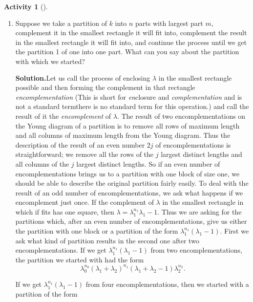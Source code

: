 \documentclass[10pt,]{book}
\theoremstyle{plain}
\theoremstyle{definition}
\newtheorem{activity}[project]{Activity}
\numberwithin{equation}{chapter}
\begin{document}
\begin{activity}[]\label{activity-56}
~\par
\begin{enumerate}[label=(\alph*)]
 \item Suppose we take a partition of \(k\) into \(n\) parts with largest part \(m\), complement it in the smallest rectangle it will fit into, complement the result in the smallest rectangle it will fit into, and continue the process until we get the partition 1 of one into one part. What can you say about the partition with which we started?%
\par\medskip\noindent%
\textbf{Solution.}\quad Let us call the process of enclosing \(\lambda\) in the smallest rectangle possible and then forming the complement in that rectangle \emph{encomplementation} (This is short for \emph{en}\/closure and \emph{complementation} and is not a standard term\textemdash{}there is no standard term for this operation.) and call the result of it the \emph{encomplement} of \(\lambda\). The result of two encomplementations on the Young diagram of a partition is to remove all rows of maximum length and all columns of maximum length from the Young diagram. Thus the description of the result of an even number \(2j\) of encomplementations is straightforward; we remove all the rows of the \(j\) largest distinct lengths and all columns of the \(j\) largest distinct lengths. So if an even number of encomplementations brings us to a partition with one block of size one, we should be able to describe the original partition fairly easily. To deal with the result of an odd number of encomplementations, we ask what happens if we encomplement just once. If the complement of \(\lambda\) in the smallest rectangle in which if fits has one square, then \(\lambda =\lambda_1^{n_1}\lambda_1-1\). Thus we are asking for the partitions which, after an even number of encomplementations, give us either the partition with one block or a partition of the form \(\lambda_1^{n_1}(\lambda_1-1)\). First we ask what kind of partition results in the second one after two encomplementations. If we get \(\lambda_1^{n_1}(\lambda_1-1)\) from two encomplementations, the partition we started with had the form%
\begin{equation*}
\lambda_0^{n_0}(\lambda_1+\lambda_{2})^{n_1}(\lambda_1+
\lambda_2-1)\lambda_2^{n_2}.
\end{equation*}
%
\par
If we get \(\lambda_1^{n_1}(\lambda_1-1)\) from four encomplementations, then we started with a partition of the form%

\end{enumerate}
\end{activity}
\end{document}
